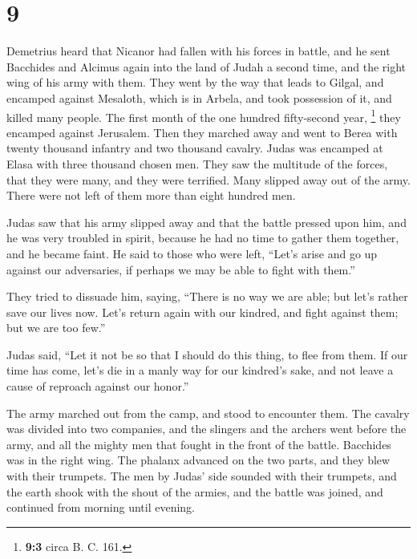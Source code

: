 \hypertarget{section-8}{%
\section{9}\label{section-8}}

 Demetrius heard that Nicanor had fallen with his forces
in battle, and he sent Bacchides and Alcimus again into the land of
Judah a second time, and the right wing of his army with them.
 They went by the way that leads to Gilgal, and encamped
against Mesaloth, which is in Arbela, and took possession of it, and
killed many people.  The first month of the one hundred
fifty-second year, \footnote{\textbf{9:3} circa B. C. 161.} they
encamped against Jerusalem.  Then they marched away and
went to Berea with twenty thousand infantry and two thousand cavalry.
 Judas was encamped at Elasa with three thousand chosen
men.  They saw the multitude of the forces, that they were
many, and they were terrified. Many slipped away out of the army. There
were not left of them more than eight hundred men.

 Judas saw that his army slipped away and that the battle
pressed upon him, and he was very troubled in spirit, because he had no
time to gather them together, and he became faint.  He
said to those who were left, ``Let's arise and go up against our
adversaries, if perhaps we may be able to fight with them.''

 They tried to dissuade him, saying, ``There is no way we
are able; but let's rather save our lives now. Let's return again with
our kindred, and fight against them; but we are too few.''

 Judas said, ``Let it not be so that I should do this
thing, to flee from them. If our time has come, let's die in a manly way
for our kindred's sake, and not leave a cause of reproach against our
honor.''

 The army marched out from the camp, and stood to
encounter them. The cavalry was divided into two companies, and the
slingers and the archers went before the army, and all the mighty men
that fought in the front of the battle.  Bacchides was in
the right wing. The phalanx advanced on the two parts, and they blew
with their trumpets.  The men by Judas' side sounded with
their trumpets, and the earth shook with the shout of the armies, and
the battle was joined, and continued from morning until evening.

